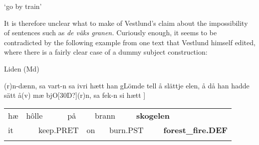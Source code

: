 \begin{styleTranslation}
‘go by train’

\end{styleTranslation}

\begin{styleBodyTextFirst}
It is therefore unclear what to make of Vestlund’s claim about the impossibility of sentences such as \textit{de väks granen. }Curiously enough, it seems to be contradicted by the following example from one text that Vestlund himself edited, where there is a fairly clear case of a dummy subject construction:

\end{styleBodyTextFirst}


\begin{listWWNumileveli}
\item {}

\begin{styleExample}
Liden (Md)

\end{styleExample}

\end{listWWNumileveli}

\begin{styleBodyTextFirstIndentii}
[Då han fick si bjO[30D?](r)n{}-dænn, sa vart-n sa ivri hætt han gLömde tell å slättje elen, å då han hadde sätt å(v) mæ bjO[30D?](r)n, sa fek-n si hætt ]

\end{styleBodyTextFirstIndentii}

\begin{tabular}{llllllllll}
\lsptoprule
hæ & \multicolumn{2}{l}{hôlle

} & \multicolumn{2}{l}{på

} & \multicolumn{2}{l}{brann

} & \multicolumn{2}{l}{{\bfseries skogelen}

} & \\
\multicolumn{2}{l}{it

} & \multicolumn{2}{l}{keep.PRET

} & \multicolumn{2}{l}{on

} & \multicolumn{2}{l}{burn.PST

} & \multicolumn{2}{l}{{\bfseries forest\_fire.DEF}

}\\
\lspbottomrule
\end{tabular}

